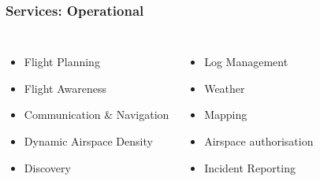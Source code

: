 \documentclass[usenames,dvipsnames,aspectratio=169,serif]{beamer}
\begin{document}

\begin{frame}
   \frametitle{Services: Operational}
   \begin{columns}[t] %

      \begin{itemize}
         \item Flight Planning
         \item Flight Awareness
         \item Communication \& Navigation
         \item Dynamic Airspace Density
         \item Discovery
      \end{itemize}

      \begin{itemize}
         \item Log Management
         \item Weather
         \item Mapping
         \item Airspace authorisation
         \item Incident Reporting
      \end{itemize}
   \end{columns}
\end{frame}
\end{document}
